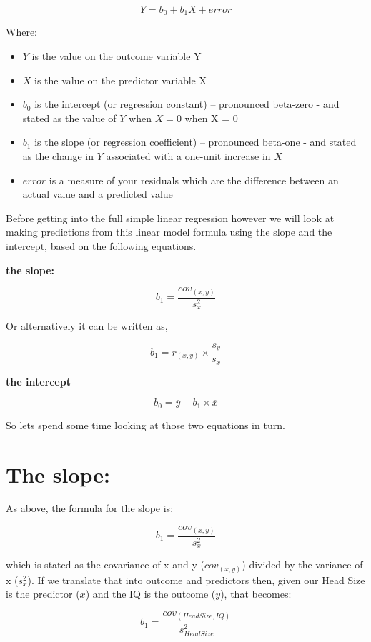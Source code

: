 \documentclass[
  oneside]{book}
\providecommand{\tightlist}{%
  \setlength{\itemsep}{0pt}\setlength{\parskip}{0pt}}
\begin{document}
\[Y = b_{0} + b_{1}X + error\]

Where:

\begin{itemize}
\tightlist
\item
  \(Y\) is the value on the outcome variable Y
\item
  \(X\) is the value on the predictor variable X
\item
  \(b_{0}\) is the intercept (or regression constant) -- pronounced beta-zero - and stated as the value of \(Y\) when \(X = 0\) when X = 0
\item
  \(b_{1}\) is the slope (or regression coefficient) -- pronounced beta-one - and stated as the change in \(Y\) associated with a one-unit increase in \(X\)
\item
  \(error\) is a measure of your residuals which are the difference between an actual value and a predicted value
\end{itemize}

Before getting into the full simple linear regression however we will look at making predictions from this linear model formula using the slope and the intercept, based on the following equations.

\textbf{the slope:}

\[b_{1} = \frac{cov_{(x, y)}}{s^2_{x}}\]

Or alternatively it can be written as,

\[b_{1} = r_{(x,y)} \times \frac{s_{y}}{s_{x}}\]

\textbf{the intercept}

\[b_{0} = \overline{y} - b_{1} \times \overline{x}\]

So lets spend some time looking at those two equations in turn.

\hypertarget{the-slope}{%
\section{The slope:}\label{the-slope}}

As above, the formula for the slope is:

\[b_{1} = \frac{cov_{(x, y)}}{s^2_{x}}\]

which is stated as the covariance of x and y (\(cov_{(x,y)}\)) divided by the variance of x (\(s^2_{x}\)). If we translate that into outcome and predictors then, given our Head Size is the predictor (\(x\)) and the IQ is the outcome (\(y\)), that becomes:

\[b_{1} = \frac{cov_{(HeadSize, IQ)}}{s^2_{HeadSize}}\]
\end{document}
